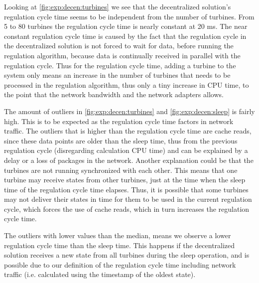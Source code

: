 Looking at \cref{fig:exp:decen:turbines} we see that the decentralized solution's regulation cycle time seems to be independent from the number of turbines. From 5 to 80 turbines the regulation cycle time is nearly constant at 20 ms.
The near constant regulation cycle time is caused by the fact that the regulation cycle in the decentralized solution is not forced to wait for data, before running the regulation algorithm, because data is continually received in parallel with the regulation cycle. Thus for the regulation cycle time, adding a turbine to the system only means an increase in the number of turbines that needs to be processed in the regulation algorithm, thus only a tiny increase in CPU time, to the point that the network bandwidth and the network adapters allows.

The amount of outliers in \cref{fig:exp:decen:turbines} and \cref{fig:exp:decen:sleep} is fairly high. This is to be expected as the regulation cycle time factors in network traffic. The outliers that is higher than the regulation cycle time are cache reads, since these data points are older than the sleep time, thus from the previous regulation cycle (disregarding calculation CPU time) and can be explained by a delay or a loss of packages in the network. Another explanation could be that the turbines are not running synchronized with each other. This means that one turbine may receive states from other turbines, just at the time when the sleep time of the regulation cycle time elapses. Thus, it is possible that some turbines may not deliver their states in time for them to be used in the current regulation cycle, which forces the use of cache reads, which in turn increases the regulation cycle time.

The outliers with lower values than the median, means we observe a lower regulation cycle time than the sleep time. This happens if the decentralized solution receives a new state from all turbines during the sleep operation, and is possible due to our definition of the regulation cycle time including network traffic (i.e. calculated using the timestamp of the oldest state).
 
\clearpage